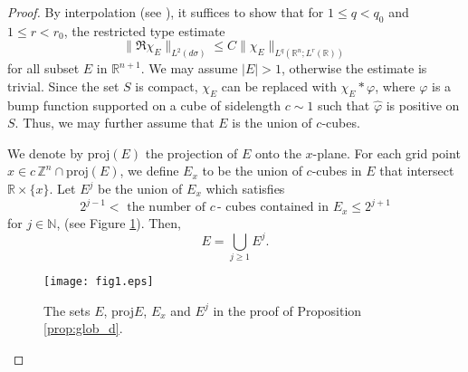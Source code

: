 \documentclass[11pt,reqno]{amsart}
\theoremstyle{plain}
\theoremstyle{definition}
\theoremstyle{remark}
\numberwithin{equation}{section}
\begin{document}
\begin{proof}
By interpolation (see \cite{F}),
it suffices to show that for $1 \leq q < q_0$ and $1 \leq r < r_0$,
the restricted type estimate
    \begin{equation*} %
    \|\mathfrak R \chi_E \|_{L^2(d\sigma)}
    \leq C   \|\chi_E\|_{L^{q}(\mathbb R^n;L^{r}(\mathbb R))}
    \end{equation*}
for all subset $E$ in $\mathbb R^{n+1}$. We may assume $|E| > 1$, otherwise the estimate is trivial.  
Since the set $S$ is compact,
$\chi_E$ can be replaced with $\chi_E \ast \varphi$, where $\varphi$ is a bump function supported on a cube of sidelength $c \sim 1$ such that $\hat \varphi$ is positive on $S$. Thus, we may further assume that $E$ is the union of $c$-cubes. 

We denote by $\mathrm{proj} (E)$ the projection of $E$ onto the $x$-plane. For each grid point $x \in c\, \mathbb Z^n \cap \mathrm{proj} (E)$, we define $E_x$ to be the union of $c$-cubes in $E$ that intersect $\mathbb R \times \{x\}$.  Let $E^j$ be the union of $E_x$ which satisfies 
           \[2^{j-1} <  \text{ the number of}\,\, c\,\text{- cubes contained in}\,\, E_x \le 2^{j+1} \]
for $j \in \mathbb N$, (see Figure \ref{fig1}).
Then,
    $$
    E= \bigcup_{j \ge 1} E^j.
    $$

\begin{figure} 
 \begin{center} 
  {\texttt{[image: fig1.eps]}}
 \end{center}
\caption{The sets $E$, proj$E$, $E_x$ and $E^j$ in the proof of Proposition \ref{prop:glob_d}.}
\label{fig1}
\end{figure}


\end{proof}
\end{document}
